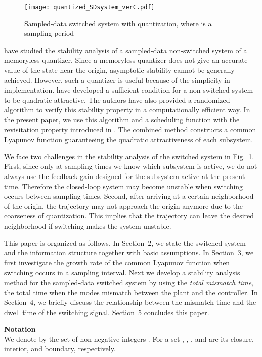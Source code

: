 \documentclass[a4, 11pt]{article}
\begin{document}
 \begin{figure}[b]
 \centering
 \texttt{[image: quantized\_SDsystem\_verC.pdf]}
 \caption{Sampled-data switched system with quantization, where  is a sampling period}
 \label{fig:WSDSLS}
 \end{figure}

\cite{Ishii2002Book,Ishii2004} have studied the stability analysis
of a sampled-data non-switched system of a memoryless quantizer.
Since a memoryless quantizer does not give an accurate value of the state near the origin, 
asymptotic stability cannot be generally achieved. 
However, 
such a quantizer is useful because of the simplicity in implementation.
\cite{Ishii2004} have developed a sufficient condition
for a non-switched system to be quadratic attractive. The authors have also
provided a randomized algorithm to verify this stability property in a computationally efficient way.
In the present paper, we use this algorithm and a scheduling function 
with the revisitation property introduced in \cite{Liberzon2004}.
The combined method constructs  a common Lyapunov function guaranteeing
the quadratic attractiveness of each subsystem.


We face two challenges in the stability analysis of the switched system in Fig.~\ref{fig:WSDSLS}.
First, since only at sampling times we know which subsystem is active, 
we do not always use the feedback gain designed for the subsystem active at
the present time.
Therefore
the closed-loop system may become unstable when switching occurs between sampling times.
Second, after arriving at a certain neighborhood of the origin,
the trajectory may not approach the origin anymore due to the coarseness of quantization. 
This implies that the trajectory can leave
the desired neighborhood if switching makes the system unstable.

This paper is organized as follows. 
In Section~2, we state the switched system and 
the information structure together with basic assumptions.
In Section~3, we first investigate the growth rate of the common
Lyapunov function when switching occurs in a sampling interval.
Next we develop
a stability analysis method for the sampled-data switched system 
by using
the {\em total mismatch time}, the total time when the modes 
mismatch between the plant and the controller.
In Section~4, we briefly discuss the relationship between the mismatch time
and the dwell time of the switching signal.
Section~5 concludes this paper.

\noindent
{\bf Notation} \\
We denote by  the set of non-negative integers
.
For a set , , 
, and  are its closure,
interior, and boundary, respectively.
\end{document}
